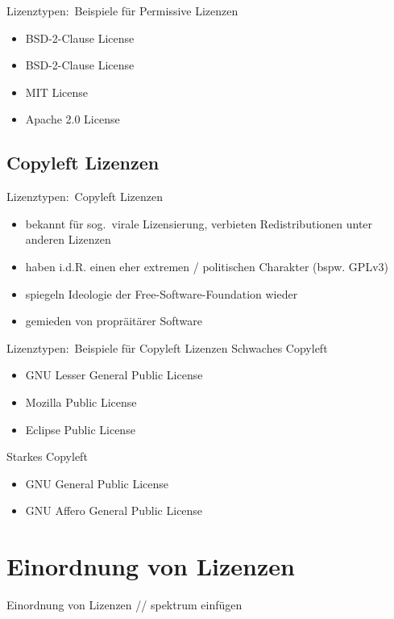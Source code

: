 \documentclass{beamer}
\begin{document}
\begin{frame}{Lizenztypen:\ Beispiele für Permissive Lizenzen}
	\begin{itemize}
		\item BSD-2-Clause License
		\item BSD-2-Clause License
		\item MIT License
		\item Apache 2.0 License
	\end{itemize}
\end{frame}

\subsection{Copyleft Lizenzen}
\begin{frame}{Lizenztypen:\ Copyleft Lizenzen}
	\begin{itemize}
		\item bekannt für sog.\ virale Lizensierung,
			verbieten Redistributionen unter anderen Lizenzen
		\item haben i.d.R. einen eher extremen / politischen Charakter (bspw. GPLv3)
		\item spiegeln Ideologie der Free-Software-Foundation wieder
		\item gemieden von propräitärer Software
	\end{itemize}
\end{frame}

\begin{frame}{Lizenztypen:\ Beispiele für Copyleft Lizenzen}
	Schwaches Copyleft
	\vspace{0.5em}
	\begin{itemize}
		\item GNU Lesser General Public License
		\item Mozilla Public License
		\item Eclipse Public License
	\end{itemize}
	\vspace{1em}

	Starkes Copyleft
	\vspace{0.5em}
	\begin{itemize}
		\item GNU General Public License
		\item GNU Affero General Public License
	\end{itemize}
\end{frame}

\section{Einordnung von Lizenzen}
\begin{frame}{Einordnung von Lizenzen}
	// spektrum einfügen
\end{frame}
\end{document}

